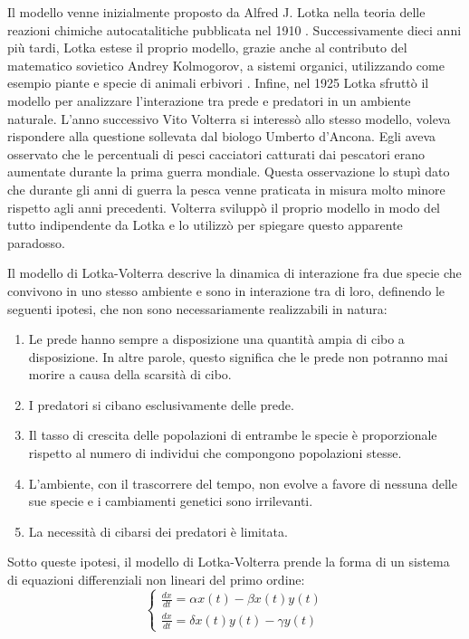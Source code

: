 \documentclass[11pt]{article}
\begin{document}
Il modello venne inizialmente proposto da Alfred J. Lotka nella teoria delle reazioni chimiche autocatalitiche pubblicata nel 1910 \cite{Goel}. Successivamente dieci anni più tardi, Lotka estese il proprio modello, grazie anche al contributo del matematico sovietico Andrey Kolmogorov, a sistemi organici, utilizzando come esempio piante e specie di animali erbivori \cite{Lotka1920}. Infine, nel 1925 Lotka sfruttò il modello per analizzare l'interazione tra prede e predatori in un ambiente naturale\cite{Lotka1925}. L'anno successivo Vito Volterra si interessò allo stesso modello, voleva rispondere alla questione sollevata dal biologo Umberto d'Ancona\cite{Bacaer}. Egli aveva osservato che le percentuali di pesci cacciatori catturati dai pescatori erano aumentate durante la prima guerra mondiale. Questa osservazione lo stupì dato che durante gli anni di guerra la pesca venne praticata in misura molto minore rispetto agli anni precedenti. Volterra sviluppò il proprio modello in modo del tutto indipendente da Lotka e lo utilizzò per spiegare questo apparente paradosso. 

Il modello di Lotka-Volterra\cite{Artioli} descrive la dinamica di interazione fra due specie che convivono in uno stesso ambiente e sono in interazione tra di loro, definendo le seguenti ipotesi, che non sono necessariamente realizzabili in natura: 
\begin{enumerate}
    \item Le prede hanno sempre a disposizione una quantità ampia di cibo a disposizione. In altre parole, questo significa che le prede non potranno mai morire a causa della scarsità di cibo. 
    \item I predatori si cibano esclusivamente delle prede. 
    \item Il tasso di crescita delle popolazioni di entrambe le specie è proporzionale rispetto al numero di individui che compongono popolazioni stesse.
    \item L'ambiente, con il trascorrere del tempo, non evolve a favore di nessuna delle sue specie e i cambiamenti genetici sono irrilevanti. 
    \item La necessità di cibarsi dei predatori è limitata. 
\end{enumerate}

Sotto queste ipotesi, il modello di Lotka-Volterra prende la forma di un sistema di equazioni differenziali non lineari del primo ordine:
\[
\label{eqn:modelloGenerale}
\left\{
\begin{array}{cc}
\frac{dx}{dt}=\alpha x(t) - \beta x(t)y(t)\\
\frac{dx}{dt}=\delta x(t)y(t) - \gamma y(t)
\end{array}
\right.
\]
\end{document}
